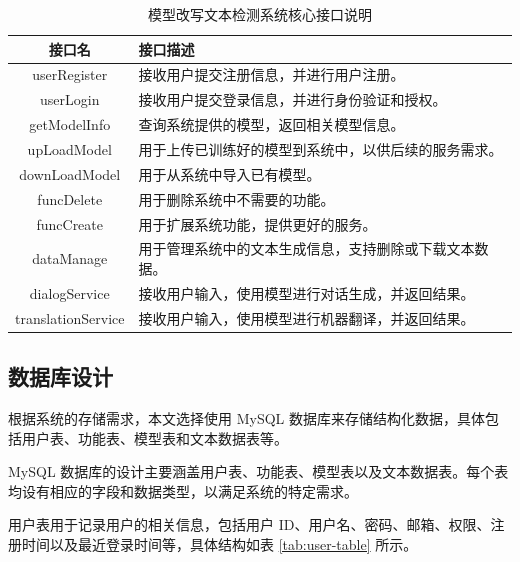 \begin{table}[htb]
    \centering
    \caption{模型改写文本检测系统核心接口说明}
    \label{tab:sys-interfaces}
    \begin{tabular}{cl}
        \toprule
        接口名 & 接口描述 \\
        \midrule
        userRegister & 接收用户提交注册信息，并进行用户注册。 \\
        userLogin & 接收用户提交登录信息，并进行身份验证和授权。 \\
        getModelInfo & 查询系统提供的模型，返回相关模型信息。 \\
        upLoadModel & 用于上传已训练好的模型到系统中，以供后续的服务需求。 \\
        downLoadModel & 用于从系统中导入已有模型。 \\
        funcDelete & 用于删除系统中不需要的功能。 \\
        funcCreate & 用于扩展系统功能，提供更好的服务。 \\
        dataManage & 用于管理系统中的文本生成信息，支持删除或下载文本数据。 \\
        dialogService & 接收用户输入，使用模型进行对话生成，并返回结果。 \\
        translationService & 接收用户输入，使用模型进行机器翻译，并返回结果。 \\
        \bottomrule
    \end{tabular}
\end{table}

\subsection{数据库设计}
\label{sec:sys-db}

根据系统的存储需求，本文选择使用 MySQL 数据库来存储结构化数据，具体包括用户表、功能表、模型表和文本数据表等。

MySQL 数据库的设计主要涵盖用户表、功能表、模型表以及文本数据表。每个表均设有相应的字段和数据类型，以满足系统的特定需求。

用户表用于记录用户的相关信息，包括用户 ID、用户名、密码、邮箱、权限、注册时间以及最近登录时间等，具体结构如表 \ref{tab:user-table} 所示。

